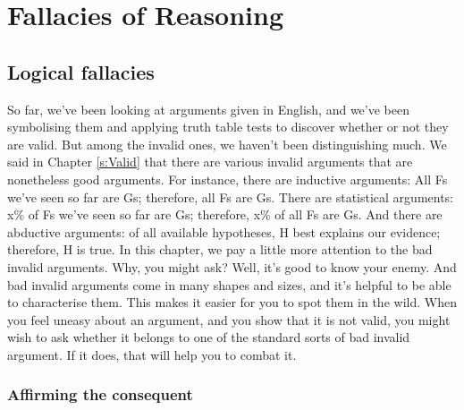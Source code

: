 \part{Fallacies of Reasoning}
\label{ch.Fallacies}

\chapter{Logical fallacies}
\label{s:LogicalFallacies}


So far, we've been looking at arguments given in English, and we've been symbolising them and applying truth table tests to discover whether or not they are valid. But among the invalid ones, we haven't been distinguishing much. We said in Chapter \ref{s:Valid} that there are various invalid arguments that are nonetheless good arguments. For instance, there are inductive arguments: All Fs we've seen so far are Gs; therefore, all Fs are Gs. There are statistical arguments: x\% of Fs we've seen so far are Gs; therefore, x\% of all Fs are Gs. And there are abductive arguments: of all available hypotheses, H best explains our evidence; therefore, H is true. In this chapter, we pay a little more attention to the bad invalid arguments. Why, you might ask? Well, it's good to know your enemy. And bad invalid arguments come in many shapes and sizes, and it's helpful to be able to characterise them. This makes it easier for you to spot them in the wild. When you feel uneasy about an argument, and you show that it is not valid, you might wish to ask whether it belongs to one of the standard sorts of bad invalid argument. If it does, that will help you to combat it.


\section{Affirming the consequent}

